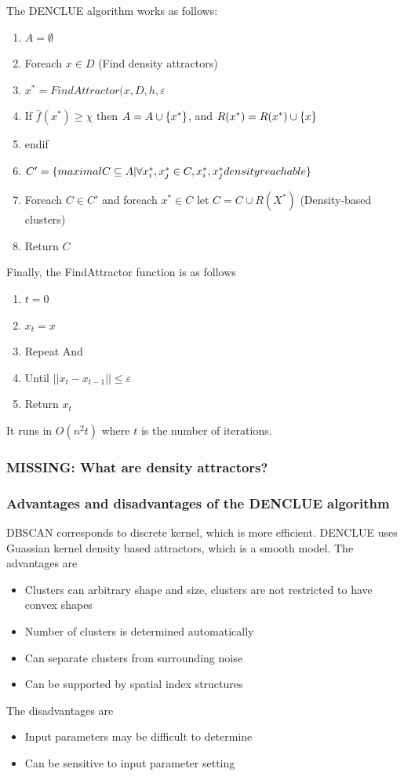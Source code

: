 The DENCLUE algorithm works as follows:
\begin{enumerate}
    \item $A = \emptyset$
    \item Foreach $x \in D$ (Find density attractors)
    \item $x^* = FindAttractor(x, D, h, \varepsilon$
    \item If $\hat{f}(x^*) \geq \chi$ then $A = A \cup \{x^*\}$, and $R(x^*) = R(x^*) \cup \{x\}$
    \item endif
    \item $C' = \{maximal C \subseteq A | \forall x_i^*, x_j^* \in C, x_i^*, x_j^* density reachable\}$
    \item Foreach $C \in C'$ and foreach $x^* \in C$ let $C = C \cup R(X^*)$ (Density-based clusters)
    \item Return $C$
\end{enumerate}
Finally, the FindAttractor function is as follows
\begin{enumerate}
    \item $t = 0$
    \item $x_t = x$
    \item Repeat 
    And 
    \item Until $||x_t - x_{t-1}|| \leq \varepsilon$
    \item Return $x_t$
\end{enumerate}
It runs in $O(n^2t)$ where $t$ is the number of iterations.

\subsubsection{MISSING: What are density attractors?}
    
\subsubsection{Advantages and disadvantages of the DENCLUE algorithm}
    DBSCAN corresponds to discrete kernel, which is more efficient. DENCLUE uses Guassian kernel density based attractors, which is a smooth model. 
    The advantages are 
    \begin{itemize}
        \item Clusters can arbitrary shape and size, clusters are not restricted to have convex shapes
        \item Number of clusters is determined automatically
        \item Can separate clusters from surrounding noise
        \item Can be supported by spatial index structures
    \end{itemize}
    The disadvantages are
    \begin{itemize}
        \item Input parameters may be difficult to determine
        \item Can be sensitive to input parameter setting
    \end{itemize}
    

